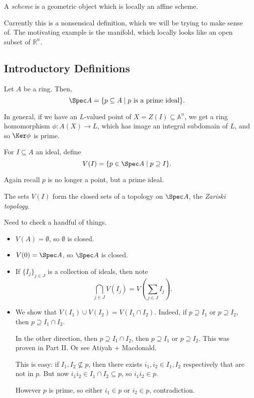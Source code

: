\documentclass[12pt]{article}
\begin{document}
\begin{definition}
	A \emph{scheme} is a geometric object which is locally an affine scheme.
\end{definition}

Currently this is a nonsensical definition, which we will be trying to make sense of. The motivating example is the manifold, which locally looks like an open subset of $\mathbb{R}^n$.

\subsection{Introductory Definitions}%
\label{sub:id}

\begin{definition}
	Let $A$ be a ring. Then,
	\[
		\Spec A = \{p \subseteq A \mid p \text{ is a prime ideal}\}.
	\]
\end{definition}

In general, if we have an $L$-valued point of $X = Z(I) \subseteq \mathbb{A}^n$, we get a ring homomorphism $\phi : A(X) \to L$, which has image an integral subdomain of $L$, and so $\Ker \phi$ is prime.

\begin{definition}
	For $I \subseteq A$ an ideal, define
	\[
		V(I) = \{p \in \Spec A \mid p \supseteq I\}.
	\]
\end{definition}
Again recall $p$ is no longer a point, but a prime ideal.

\begin{proposition}
	The sets $V(I)$ form the closed sets of a topology on $\Spec A$, the \emph{Zariski topology}.
\end{proposition}

\begin{proofbox}
	Need to check a handful of things.
	\begin{itemize}
		\item $V(A) = \emptyset$, so $\emptyset$ is closed.
		\item $V(0) = \Spec A$, so $\Spec A$ is closed.
		\item If $\{I_j\}_{j \in J}$ is a collection of ideals, then note
			\[
			\bigcap_{j \in J} V(I_j)= V \left( \sum_{j \in J} I_j \right).
			\]
		\item We show that $V(I_1) \cup V(I_2) = V(I_1 \cap I_2)$. Indeed, if $p \supseteq I_1$ or $p \supseteq I_2$, then $p \supseteq I_1 \cap I_2$.

			In the other direction, then $p \supseteq I_1 \cap I_2$, then $p \supseteq I_1$ or $p \supseteq I_2$. This was proven in Part II. Or see Atiyah + Macdonald.

			This is easy: if $I_1, I_2 \not \subseteq p$, then there exists $i_1, i_2 \in I_1, I_2$ respectively that are not in $p$. But now $i_1 i_2 \in I_1 \cap I_2 \subseteq p$, so $i_1 i_2 \in p$.

			However $p$ is prime, so either $i_1 \in p$ or $i_2 \in p$, contradiction.
	\end{itemize}
\end{proofbox}
\end{document}
